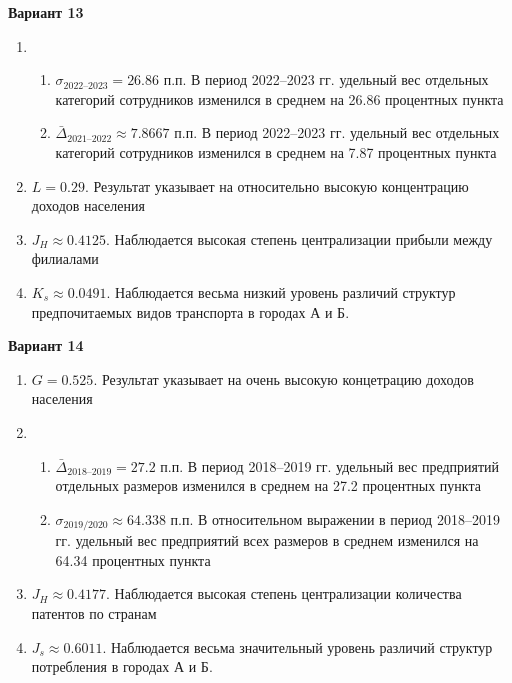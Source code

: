 \documentclass{article}
\begin{document}
\textbf{Вариант 13}
\begin{enumerate}
\item \begin{enumerate} \item $\sigma_\text{2022--2023}= 26.86$ п.п. В период 2022--2023 гг. удельный вес отдельных категорий сотрудников изменился в среднем на 26.86 процентных пункта
\item $\bar\Delta_\text{2021--2022}\approx 7.8667$ п.п. В период 2022--2023 гг. удельный вес отдельных категорий сотрудников изменился в среднем на 7.87 процентных пункта\end{enumerate}
\item $L= 0.29$. Результат указывает на относительно высокую концентрацию доходов населения
\item $J_H \approx 0.4125$. Наблюдается высокая степень централизации прибыли между филиалами
\item $K_s\approx 0.0491$. Наблюдается весьма низкий уровень различий структур предпочитаемых видов транспорта в городах А и Б.
\end{enumerate}

\textbf{Вариант 14}
\begin{enumerate}
\item $G= 0.525$. Результат указывает на очень высокую концетрацию доходов населения
\item \begin{enumerate} \item $\bar\Delta_\text{2018--2019}= 27.2$ п.п. В период 2018--2019 гг. удельный вес предприятий отдельных размеров изменился в среднем на 27.2 процентных пункта
\item $\sigma_\text{2019/2020}\approx 64.338$ п.п. В относительном выражении в период 2018--2019 гг. удельный вес предприятий всех размеров в среднем изменился на 64.34 процентных пункта\end{enumerate}
\item $J_H \approx 0.4177$. Наблюдается высокая степень централизации количества патентов по странам
\item $J_s\approx 0.6011$. Наблюдается весьма значительный уровень различий структур потребления в городах А и Б.
\end{enumerate}
\end{document}
